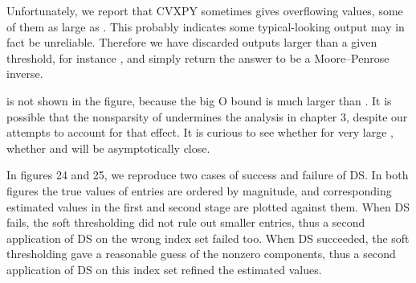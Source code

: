 Unfortunately, we report that CVXPY sometimes gives overflowing values, some of them as large as .
This probably indicates some typical-looking output may in fact be unreliable.
Therefore we have discarded outputs larger than a given threshold, for instance , and simply return the answer to be a Moore–Penrose inverse.

\m {\chi} is not shown in the figure, because the big O bound is much larger than \m {\tilde {\chi}}.
It is possible that the nonsparsity of  undermines the analysis in chapter 3, despite our attempts to account for that effect.
It is curious to see whether for very large , whether \m {\tilde {\chi}} and \m {\tilde {\chi}} will be asymptotically close.

In figures 24 and 25, we reproduce two cases of success and failure of DS.
In both figures the true values of  entries are ordered by magnitude, and corresponding estimated values in the first and second stage are plotted against them.
When DS fails, the soft thresholding did not rule out smaller entries, thus a second application of DS on the wrong index set failed too.
When DS succeeded, the soft thresholding gave a reasonable guess of the nonzero components, thus a second application of DS on this index set refined the estimated values.


